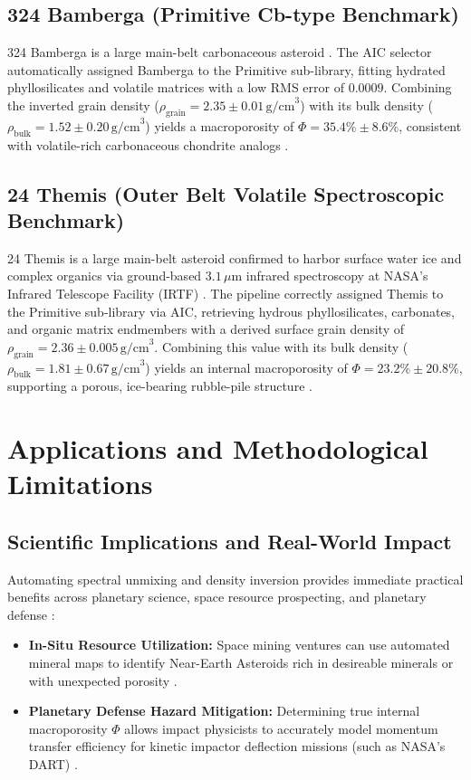 \documentclass[11pt,a4paper]{article}
\begin{document}
\subsection{324 Bamberga (Primitive Cb-type Benchmark)}
324 Bamberga is a large main-belt carbonaceous asteroid \cite{DeMeo2009}. The AIC selector automatically assigned Bamberga to the Primitive sub-library, fitting hydrated phyllosilicates and volatile matrices with a low RMS error of $0.0009$. Combining the inverted grain density ($\rho_{\text{grain}} = 2.35 \pm 0.01\,\text{g/cm}^3$) with its bulk density ($\rho_{\text{bulk}} = 1.52 \pm 0.20\,\text{g/cm}^3$) yields a macroporosity of $\Phi = 35.4\% \pm 8.6\%$, consistent with volatile-rich carbonaceous chondrite analogs \cite{Macke2011}.

\subsection{24 Themis (Outer Belt Volatile Spectroscopic Benchmark)}
24 Themis is a large main-belt asteroid confirmed to harbor surface water ice and complex organics via ground-based $3.1\,\mu\text{m}$ infrared spectroscopy at NASA's Infrared Telescope Facility (IRTF) \cite{Campins2010, Rivkin2002}. The pipeline correctly assigned Themis to the Primitive sub-library via AIC, retrieving hydrous phyllosilicates, carbonates, and organic matrix endmembers with a derived surface grain density of $\rho_{\text{grain}} = 2.36 \pm 0.005\,\text{g/cm}^3$. Combining this value with its bulk density ($\rho_{\text{bulk}} = 1.81 \pm 0.67\,\text{g/cm}^3$) yields an internal macroporosity of $\Phi = 23.2\% \pm 20.8\%$, supporting a porous, ice-bearing rubble-pile structure \cite{Campins2010, Rivkin2002}.

\section{Applications and Methodological Limitations}
\label{sec:implications_risks}

\subsection{Scientific Implications and Real-World Impact}
Automating spectral unmixing and density inversion provides immediate practical benefits across planetary science, space resource prospecting, and planetary defense \cite{DeMeo2009, Britt2002, Lauretta2019, Watanabe2019}:
\begin{itemize}
    \item \textbf{In-Situ Resource Utilization:} Space mining ventures can use automated mineral maps to identify Near-Earth Asteroids rich in desireable minerals or with unexpected porosity \cite{Rivkin2002, Lauretta2019, Watanabe2019}.
    \item \textbf{Planetary Defense Hazard Mitigation:} Determining true internal macroporosity $\Phi$ allows impact physicists to accurately model momentum transfer efficiency for kinetic impactor deflection missions (such as NASA's DART) \cite{Britt2002}.
\end{itemize}
\end{document}
